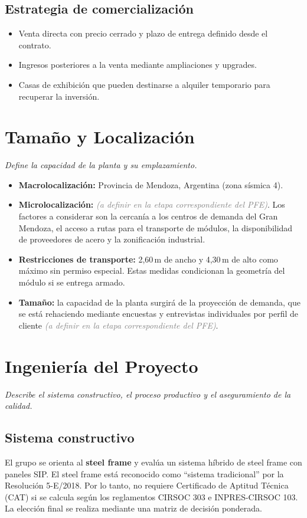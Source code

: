 \documentclass[11pt,a4paper]{article}
\newcommand{\pend}{\textcolor{gray}{\textit{(a definir en la etapa correspondiente del PFE)}}}
\begin{document}
\subsection{Estrategia de comercialización}
\begin{itemize}
  \item Venta directa con precio cerrado y plazo de entrega definido desde el contrato.
  \item Ingresos posteriores a la venta mediante ampliaciones y upgrades.
  \item Casas de exhibición que pueden destinarse a alquiler temporario para recuperar la inversión.
\end{itemize}

\section{Tamaño y Localización}
\textit{Define la capacidad de la planta y su emplazamiento.}

\begin{itemize}
  \item \textbf{Macrolocalización:} Provincia de Mendoza, Argentina (zona sísmica 4).
  \item \textbf{Microlocalización:} \pend. Los factores a considerar son la cercanía a los centros de demanda del Gran Mendoza, el acceso a rutas para el transporte de módulos, la disponibilidad de proveedores de acero y la zonificación industrial.
  \item \textbf{Restricciones de transporte:} 2,60\,m de ancho y 4,30\,m de alto como máximo sin permiso especial. Estas medidas condicionan la geometría del módulo si se entrega armado.
  \item \textbf{Tamaño:} la capacidad de la planta surgirá de la proyección de demanda, que se está rehaciendo mediante encuestas y entrevistas individuales por perfil de cliente \pend.
\end{itemize}

\section{Ingeniería del Proyecto}
\textit{Describe el sistema constructivo, el proceso productivo y el aseguramiento de la calidad.}

\subsection{Sistema constructivo}
El grupo se orienta al \textbf{steel frame} y evalúa un sistema híbrido de steel frame con paneles SIP. El steel frame está reconocido como ``sistema tradicional'' por la Resolución 5-E/2018. Por lo tanto, no requiere Certificado de Aptitud Técnica (CAT) si se calcula según los reglamentos CIRSOC 303 e INPRES-CIRSOC 103. La elección final se realiza mediante una matriz de decisión ponderada.
\end{document}
